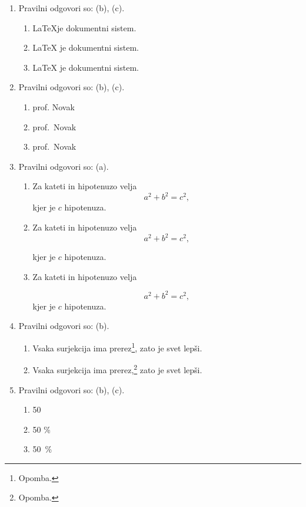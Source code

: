 \documentclass[11pt]{article}
\begin{document}
\begin{enumerate}
    \item Pravilni odgovori so: (b), (c).
    \begin{enumerate}
        \item \LaTeX je dokumentni sistem.
        \item {\LaTeX} je dokumentni sistem.
        \item \LaTeX{} je dokumentni sistem.
    \end{enumerate}

    \item Pravilni odgovori so: (b), (c).
    \begin{enumerate}
        \item prof. Novak
        \item prof.~Novak
        \item prof.\ Novak
    \end{enumerate}

    \item Pravilni odgovori so: (a).
    \begin{enumerate}
        \item
Za kateti in hipotenuzo velja
\[
  a^2 + b^2 = c^2,
\]
kjer je \(c\) hipotenuza.
        \item
Za kateti in hipotenuzo velja
\[
  a^2 + b^2 = c^2,
\]

kjer je \(c\) hipotenuza.
        \item
Za kateti in hipotenuzo velja

\[
  a^2 + b^2 = c^2,
\]
kjer je \(c\) hipotenuza.
    \end{enumerate}

    \item Pravilni odgovori so: (b).
    \begin{enumerate}
        \item Vsaka surjekcija ima prerez\footnote{Opomba.}, zato je svet lepši.
        \item Vsaka surjekcija ima prerez,\footnote{Opomba.} zato je svet lepši.
    \end{enumerate}

    \item Pravilni odgovori so: (b), (c).
    \begin{enumerate}
        \item 50 %
        \item 50 \%
        \item 50~\%
    \end{enumerate}


\end{enumerate}
\end{document}
